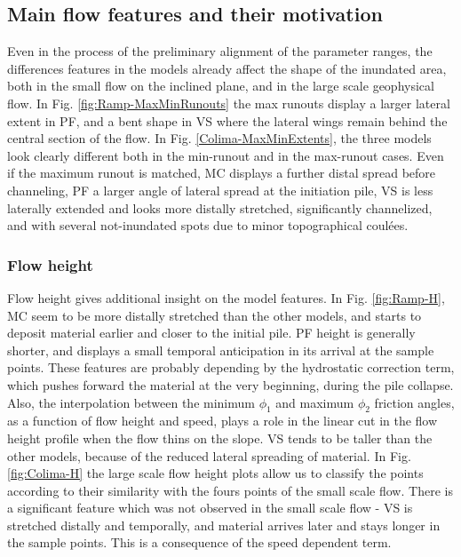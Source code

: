 \documentclass{article}
\begin{document}
\subsection{Main flow features and their motivation}
Even in the process of the preliminary alignment of the parameter ranges, the differences features in the models already affect the shape of the inundated area, both in the small flow on the inclined plane, and in the large scale geophysical flow. In Fig. \ref{fig:Ramp-MaxMinRunouts} the max runouts display a larger lateral extent in PF, and a bent shape in VS where the lateral wings remain behind the central section of the flow. In Fig. \ref{Colima-MaxMinExtents}, the three models look clearly different both in the min-runout and in the max-runout cases. Even if the maximum runout is matched, MC displays a further distal spread before channeling, PF a larger angle of lateral spread at the initiation pile, VS is less laterally extended and looks more distally stretched, significantly channelized, and with several not-inundated spots due to minor topographical coul\'{e}es.

\subsubsection{Flow height}
Flow height gives additional insight on the model features. In Fig. \ref{fig:Ramp-H}, MC seem to be more distally stretched than the other models, and starts to deposit material earlier and closer to the initial pile. PF height is generally shorter, and displays a small temporal anticipation in its arrival at the sample points. These features are probably depending by the hydrostatic correction term, which pushes forward the material at the very beginning, during the pile collapse. Also, the interpolation between the minimum $\phi_1$ and maximum $\phi_2$ friction angles, as a function of flow height and speed, plays a role in the linear cut in the flow height profile when the flow thins on the slope. VS tends to be taller than the other models, because of the reduced lateral spreading of material. In Fig. \ref{fig:Colima-H} the large scale flow height plots allow us to classify the points according to their similarity with the fours points of the small scale flow. There is a significant feature which was not observed in the small scale flow - VS is stretched distally and temporally, and material arrives later and stays longer in the sample points. This is a consequence of the speed dependent term.
\end{document}

